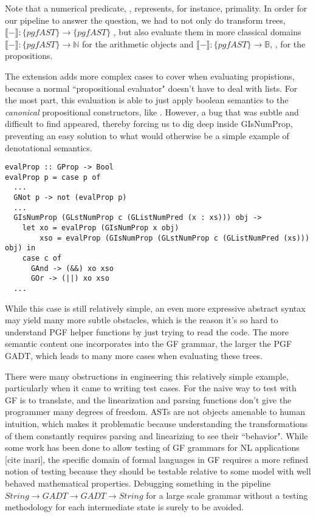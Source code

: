 Note that a numerical predicate, , represents, for instance,
primality. In order for our pipeline to answer the question, we had to not only
do transform trees, $\llbracket - \rrbracket : \{pgfAST\} \rightarrow
\{pgfAST\}$ , but also evaluate them in more classical domains $\llbracket -
\rrbracket : \{pgfAST\} \rightarrow \mathds{N}$ for the arithmetic objects and
$\llbracket - \rrbracket : \{pgfAST\} \rightarrow \mathds{B}$,
, for the propositions.

The extension adds more complex cases  to cover when
evaluating propistions, because a normal ``propositional evaluator" doesn't have to
deal with lists. For the most part, this evaluation is able to just apply
boolean semantics to the \emph{canonical} propositional constructors, like . However, a
bug that was subtle and difficult to find appeared, thereby forcing us to dig
deep inside GIsNumProp, preventing an easy solution to what would otherwise be a
simple example of denotational semantics.
\begin{verbatim}
evalProp :: GProp -> Bool
evalProp p = case p of
  ...
  GNot p -> not (evalProp p)
  ...
  GIsNumProp (GLstNumProp c (GListNumPred (x : xs))) obj ->
    let xo = evalProp (GIsNumProp x obj)
        xso = evalProp (GIsNumProp (GLstNumProp c (GListNumPred (xs))) obj) in
    case c of
      GAnd -> (&&) xo xso
      GOr -> (||) xo xso
  ...
\end{verbatim}
While this case is still relatively simple, an even more expressive abstract syntax
may yield many more subtle obstacles, which is the reason it's so hard
to understand PGF helper functions by just trying to read the code. The more semantic content one
incorporates into the GF grammar, the larger the PGF GADT, which leads to many
more cases when evaluating these trees.

There were many obstructions in engineering this relatively simple
example, particularly when it came to writing test cases. For the naive
way to test with GF is to translate, and the linearization and parsing functions
don't give the programmer many degrees of freedom. ASTs are not objects amenable
to human intuition, which makes it problematic because understanding the
transformations of them constantly requires parsing and linearizing to see their
``behavior". While some work has been done to allow testing
of GF grammars for NL applications [cite inari], the specific domain of formal languages in
GF requires a more refined notion of testing because they should be testable
relative to some model with well behaved mathematical properties. Debugging
something in the pipeline $String \rightarrow GADT \rightarrow GADT \rightarrow
String$ for a large scale grammar without a testing methodology for each
intermediate state is surely to be avoided.


